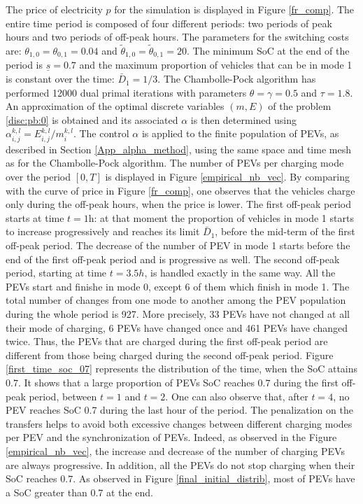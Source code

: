 \documentclass[conference]{IEEEtran}
\begin{document}
The price of electricity $p$ for the simulation is displayed in Figure \ref{fr_comp}. The entire time period is composed of four different periods: two periods of peak hours and two periods of off-peak hours. The parameters for the switching costs are: $\theta_{1,0}=\theta_{0,1} = 0.04$ and $\tilde{\theta}_{1,0}=\tilde{\theta}_{0,1} =  20$. The minimum SoC at the end of the period is $\underline{s}=0.7$ and  the maximum proportion of vehicles that can be in mode 1 is constant over the time: $\bar{D}_1 = 1/3$.
The Chambolle-Pock algorithm has performed 12000 dual primal iterations with parameters $\theta = \gamma = 0.5$ and $\tau =1.8$.
 An approximation of the optimal discrete variables $(m,E)$ of the problem \eqref{disc:pb:0} is obtained and its associated $\alpha$ is then determined using $\alpha_{i,j}^{k,l} = E_{i,j}^{k,l}/m_i^{k,l}$. 
The control $\alpha$ is applied to the finite population of PEVs, as described in Section \ref{App_alpha_method}, using the same space and time mesh as for the Chambolle-Pock algorithm. The number of PEVs per charging mode over the period $[0,T]$ is displayed in Figure \ref{empirical_nb_vec}. By comparing with the curve of price in Figure  \ref{fr_comp}, one observes that the vehicles  charge only during the off-peak hours, when the price is lower. The first off-peak period starts at time $t = 1$h: at that moment the proportion of vehicles in mode 1 starts to increase progressively and
reaches its limit $\bar{D}_1$, before the mid-term of the first off-peak period. The decrease of the number of PEV in mode 1 starts before the end of the first off-peak period and is progressive as well. The second off-peak period, starting at time $t=3.5h$,  is handled exactly in the same way. All the PEVs start and finishe in mode 0, except 6 of them which finish in mode 1.
The total number of changes from one mode to another among the PEV population during the whole period is 927. More precisely, 33 PEVs have not changed at all their mode of charging, 6 PEVs have changed once  and 461 PEVs have changed twice. 
Thus, the PEVs that are charged during the first off-peak period are different from those being charged during the second off-peak period. Figure \ref{first_time_soc_07} represents the distribution of the time, when the SoC attains $0.7$. It shows that a large proportion of PEVs SoC reaches $0.7$ during the first off-peak period, between $t=1$ and $t=2$. One can also observe that, after $t=4$, no PEV reaches SoC 0.7 during the last hour of the period.
The penalization on the transfers helps to avoid both excessive changes between different charging modes per PEV and the synchronization of PEVs. Indeed, as observed in the Figure \ref{empirical_nb_vec}, the increase and decrease of the number of charging PEVs are always progressive. In addition, all the PEVs do not stop charging when their SoC reaches $0.7$. As observed in Figure \ref{final_initial_distrib}, most of PEVs have a SoC greater than 0.7 at the end. 
\end{document}
